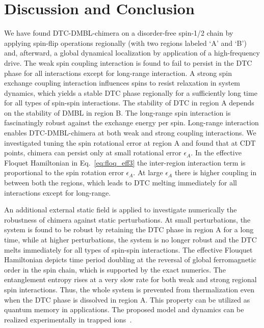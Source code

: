 \documentclass[%
reprint,
superscriptaddress,
amsmath,amssymb,showkeys,
aps,
prb,
]{revtex4-2}
\begin{document}
	
	\section{\label{sec:level7} Discussion and Conclusion}
	
	We have found DTC-DMBL-chimera on a  disorder-free spin-1/2 chain by applying spin-flip operations regionally (with two regions labeled `A' and `B') and, afterward, a global dynamical localization by application of  a high-frequency drive. The weak spin coupling interaction is found to fail to persist in the DTC phase for all interactions except for long-range interaction. A strong spin exchange coupling interaction influences spins to resist relaxation in system dynamics, which yields a stable DTC phase regionally for a sufficiently long time for all types of spin-spin interactions. The stability of DTC in region A depends on the stability of DMBL in region B. The long-range spin interaction is fascinatingly robust against the exchange energy per spin. Long-range interaction enables DTC-DMBL-chimera at both weak and strong coupling interactions. We investigated tuning the spin rotational error at region A and found that at CDT points, chimera can persist only at small rotational error $\epsilon_A$. In the effective Floquet Hamiltonian in Eq.~\ref{eq:floq_eff3} the inter-region interaction term is proportional to the spin rotation error $\epsilon_A$. At large $\epsilon_A$ there is higher coupling in between both the regions, which leads to DTC melting immediately for all interactions except for long-range. 
	
	An additional external static field is applied to investigate numerically the robustness of chimera against static perturbations. At small perturbations, the system is found to be robust by retaining the DTC phase in region A for a long time, while at higher perturbations, the system is no longer robust and the DTC melts immediately for all types of spin-spin interactions. The effective Flouquet Hamiltonian depicts time period doubling at the reversal of global ferromagnetic order in the spin chain, which is supported by the exact numerics. The entanglement entropy rises at a very slow rate for both weak and strong regional spin interactions. Thus, the whole system is prevented from thermalization even when the DTC phase is dissolved in region A. This property can be utilized as quantum memory in applications. The proposed model and dynamics can be realized experimentally in trapped ions~\cite{sakurai_phys_nodate, Friedenauer2008}.
	
\end{document}
